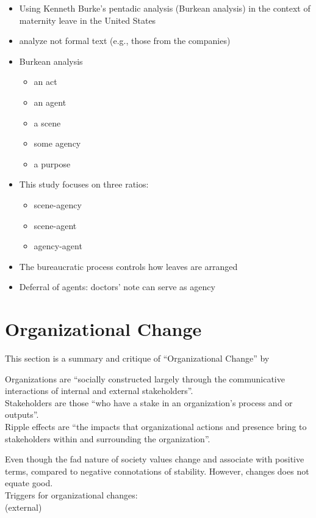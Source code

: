 \documentclass[
]{book}
\begin{document}
\begin{itemize}
\item
  Using Kenneth Burke's pentadic analysis (Burkean analysis) in the context of maternity leave in the United States
\item
  analyze not formal text (e.g., those from the companies)
\item
  Burkean analysis

  \begin{itemize}
  \item
    an act
  \item
    an agent
  \item
    a scene
  \item
    some agency
  \item
    a purpose
  \end{itemize}
\item
  This study focuses on three ratios:

  \begin{itemize}
  \item
    scene-agency
  \item
    scene-agent
  \item
    agency-agent
  \end{itemize}
\item
  The bureaucratic process controls how leaves are arranged
\item
  Deferral of agents: doctors' note can serve as agency
\end{itemize}

\hypertarget{organizational-change}{%
\chapter{Organizational Change}\label{organizational-change}}

This section is a summary and critique of ``Organizational Change'' by \citep{Lewis_2019}

Organizations are ``socially constructed largely through the communicative interactions of internal and external
stakeholders''.\\
Stakeholders are those ``who have a stake in an organization's process and or outputs''.\\
Ripple effects are ``the impacts that organizational actions and presence bring to stakeholders within and surrounding
the organization''.

Even though the fad nature of society values change and associate with positive terms, compared to negative connotations
of stability. However, changes does not equate good.\\
Triggers for organizational changes:\\
(external)
\end{document}
